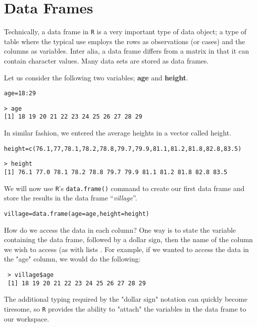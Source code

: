 \documentclass[11pt]{article} %
\begin{document}
\tableofcontents


\section{Data Frames}
Technically, a data frame in \texttt{R} is a very important type of data object;  a type of table where the typical use employs the rows as observations (or cases) and the columns as variables.
Inter alia, a data frame differs from a matrix in that it can contain character values. Many data sets are stored as data frames.

Let us consider the following two variables; \textbf{age} and \textbf{height}.

\begin{framed}
\begin{verbatim}
age=18:29
\end{verbatim}
\end{framed}
\begin{verbatim}
> age
[1] 18 19 20 21 22 23 24 25 26 27 28 29
\end{verbatim}
In similar fashion, we entered the average heights in a vector called height.
\begin{framed}
\begin{verbatim}
height=c(76.1,77,78.1,78.2,78.8,79.7,79.9,81.1,81.2,81.8,82.8,83.5)
\end{verbatim}
\end{framed}
\begin{verbatim}
> height
[1] 76.1 77.0 78.1 78.2 78.8 79.7 79.9 81.1 81.2 81.8 82.8 83.5
\end{verbatim}




We will now use \texttt{R}'s \texttt{data.frame()} command to create our first data frame and store the results in the data frame “\textit{village}”.
\begin{framed}
\begin{verbatim}
village=data.frame(age=age,height=height)
\end{verbatim}
\end{framed}

How do we access the data in each column? One way is to state the variable containing the data frame, followed by a dollar sign, then the name of the column we wish to access (as with lists . For example, if we wanted to access the data in the "age" column, we would do the following:
\begin{verbatim}
 > village$age
 [1] 18 19 20 21 22 23 24 25 26 27 28 29
\end{verbatim}
The additional typing required by the "dollar sign" notation can quickly become tiresome, so \texttt{R} provides the ability to "attach" the variables in the data frame to our workspace.
\end{document}
